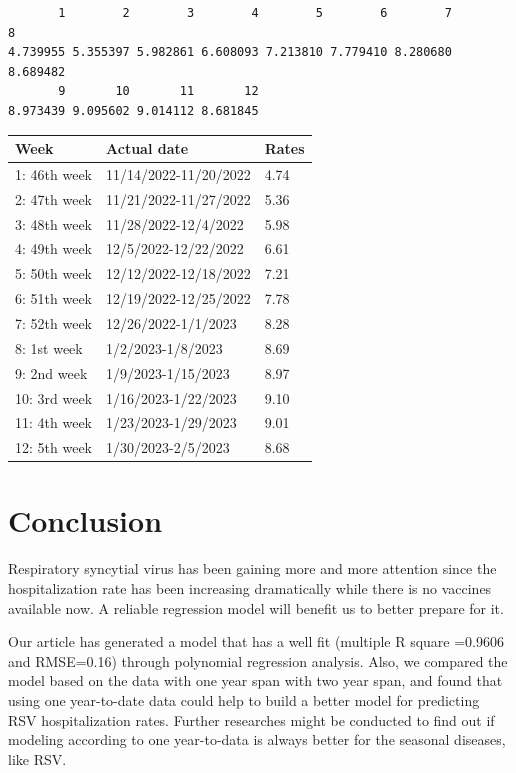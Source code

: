 \documentclass[
  letterpaper,
  DIV=11,
  numbers=noendperiod]{scrreport}
\begin{document}
\begin{verbatim}
       1        2        3        4        5        6        7        8 
4.739955 5.355397 5.982861 6.608093 7.213810 7.779410 8.280680 8.689482 
       9       10       11       12 
8.973439 9.095602 9.014112 8.681845 
\end{verbatim}

\begin{longtable}[]{@{}lll@{}}
\toprule()
Week & Actual date & Rates \\
\midrule()
\endhead
1: 46th week & 11/14/2022-11/20/2022 & 4.74 \\
2: 47th week & 11/21/2022-11/27/2022 & 5.36 \\
3: 48th week & 11/28/2022-12/4/2022 & 5.98 \\
4: 49th week & 12/5/2022-12/22/2022 & 6.61 \\
5: 50th week & 12/12/2022-12/18/2022 & 7.21 \\
6: 51th week & 12/19/2022-12/25/2022 & 7.78 \\
7: 52th week & 12/26/2022-1/1/2023 & 8.28 \\
8: 1st week & 1/2/2023-1/8/2023 & 8.69 \\
9: 2nd week & 1/9/2023-1/15/2023 & 8.97 \\
10: 3rd week & 1/16/2023-1/22/2023 & 9.10 \\
11: 4th week & 1/23/2023-1/29/2023 & 9.01 \\
12: 5th week & 1/30/2023-2/5/2023 & 8.68 \\
\bottomrule()
\end{longtable}


\hypertarget{conclusion}{%
\chapter{Conclusion}\label{conclusion}}

Respiratory syncytial virus has been gaining more and more attention
since the hospitalization rate has been increasing dramatically while
there is no vaccines available now. A reliable regression model will
benefit us to better prepare for it.

Our article has generated a model that has a well fit (multiple R square
=0.9606 and RMSE=0.16) through polynomial regression analysis. Also, we
compared the model based on the data with one year span with two year
span, and found that using one year-to-date data could help to build a
better model for predicting RSV hospitalization rates. Further
researches might be conducted to find out if modeling according to one
year-to-data is always better for the seasonal diseases, like RSV.
\end{document}
